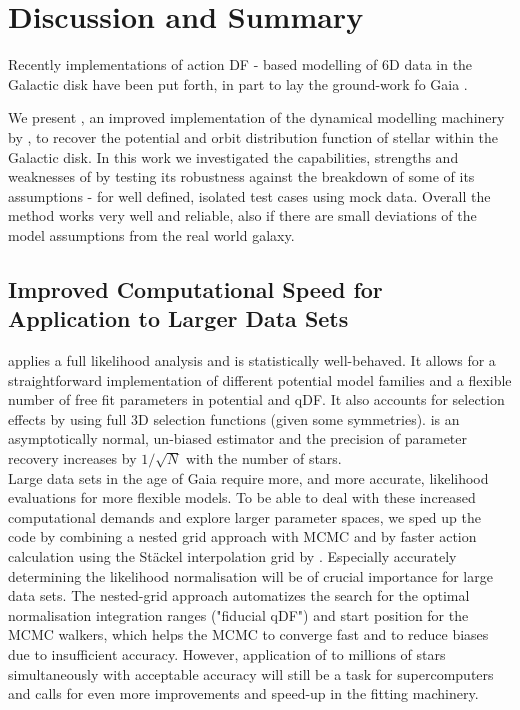 \section{Discussion and Summary} \label{sec:discussionsummary}

Recently implementations of action DF - based modelling of 6D data in the Galactic disk have been put forth, in part to lay the ground-work fo Gaia \citep{bov13,2013MNRAS.433.1411M,pif14,san15}.
 
 We present \RM, an improved implementation of the dynamical modelling machinery by \citet{bov13}, to recover the potential and orbit distribution function of stellar \MAPs within the Galactic disk. In this work we investigated the capabilities, strengths and weaknesses of \RM by testing its robustness against the breakdown of some of its assumptions - for well defined, isolated test cases using mock data. Overall the method works very well and reliable, also if there are small deviations of the model assumptions from the real world galaxy.

\subsection{Improved Computational Speed for Application to Larger Data Sets}

\RM applies a full likelihood analysis and is statistically well-behaved. It allows for a straightforward implementation of different potential model families and a flexible number of free fit parameters in potential and qDF. It also accounts for selection effects by using full 3D selection functions (given some symmetries). \RM is an asymptotically normal, un-biased estimator and the precision of parameter recovery increases by $1/\sqrt{N}$ with the number of stars.\\

Large data sets in the age of Gaia require more, and more accurate, likelihood evaluations for more flexible models. To be able to deal with these increased computational demands and explore larger parameter spaces, we sped up the code by combining a nested grid approach with MCMC and by faster action calculation using the St\"{a}ckel \citep{bin12} interpolation grid by \citet{bov15}. Especially accurately determining the likelihood normalisation will be of crucial importance for large data sets. The nested-grid approach automatizes the search for the optimal normalisation integration ranges ("fiducial qDF") and start position for the MCMC walkers, which helps the MCMC to converge fast and to reduce biases due to insufficient accuracy. However, application of \RM to millions of stars simultaneously with acceptable accuracy will still be a task for supercomputers and calls for even more improvements and speed-up in the fitting machinery.

